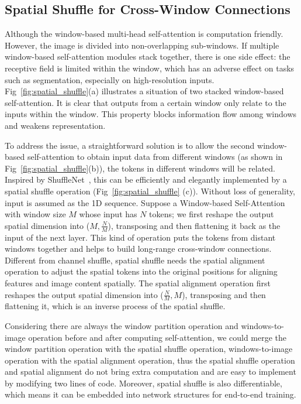 \documentclass{article}
\begin{document}
\subsection{Spatial Shuffle for Cross-Window Connections} \label{Spatial_Shuffle}


Although the window-based multi-head self-attention is computation friendly. However, the image is divided into non-overlapping sub-windows. If multiple window-based self-attention modules stack together, there is one side effect: the receptive field is limited within the window, which has an adverse effect on tasks such as segmentation, especially on high-resolution inputs. Fig~\ref{fig:spatial_shuffle}(a) illustrates a situation of two stacked window-based self-attention. It is clear that outputs from a certain window only relate to the inputs within the window. This property blocks information flow among windows and weakens representation.

To address the issue, a straightforward solution is to allow the second window-based self-attention to obtain input data from different windows (as shown in Fig~\ref{fig:spatial_shuffle}(b)), the tokens in different windows will be related. Inspired by ShuffleNet~\cite{zhang2018shufflenet}, this can be efficiently and elegantly implemented by a spatial shuffle operation (Fig~\ref{fig:spatial_shuffle} (c)). Without loss of generality, input is assumed as the 1D sequence. Suppose a Window-based Self-Attention with window size $M$ whose input has $N$ tokens; we first reshape the output spatial dimension into ($M, \frac{N}{M}$), transposing and then flattening it back as the input of the next layer. 
This kind of operation puts the tokens from distant windows together and helps to build long-range cross-window connections. Different from channel shuffle, spatial shuffle needs the spatial alignment operation to adjust the spatial tokens into the original positions for aligning features and image content spatially. The spatial alignment operation first reshapes the output spatial dimension into ($\frac{N}{M}, M$), transposing and then flattening it, which is an inverse process of the spatial shuffle. 

Considering there are always the window partition operation and windows-to-image operation before and after computing self-attention, we could merge the window partition operation with the spatial shuffle operation, windows-to-image operation with the spatial alignment operation, thus the spatial shuffle operation and spatial alignment do not bring extra computation and are easy to implement by modifying two lines of code.  Moreover, spatial shuffle is also differentiable, which means it can be embedded into network structures for end-to-end training. 
\end{document}
